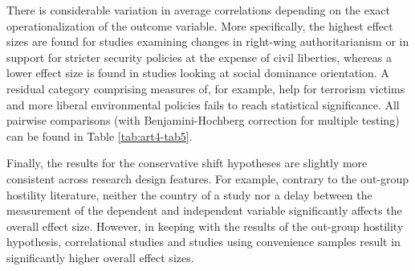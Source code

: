 There is considerable variation in average correlations depending on the exact operationalization of the outcome variable. More specifically, the highest effect sizes are found for studies examining changes in right-wing authoritarianism or in support for stricter security policies at the expense of civil liberties, whereas a lower effect size is found in studies looking at social dominance orientation. A residual category comprising measures of, for example, help for terrorism victims and more liberal environmental policies fails to reach statistical significance. All pairwise comparisons (with Benjamini-Hochberg correction for multiple testing) can be found in Table \ref{tab:art4-tab5}.

Finally, the results for the conservative shift hypotheses are slightly more consistent across research design features. For example, contrary to the out-group hostility literature, neither the country of a study nor a delay between the measurement of the dependent and independent variable significantly affects the overall effect size. However, in keeping with the results of the out-group hostility hypothesis, correlational studies and studies using convenience samples result in significantly higher overall effect sizes.

\vspace{3mm}

